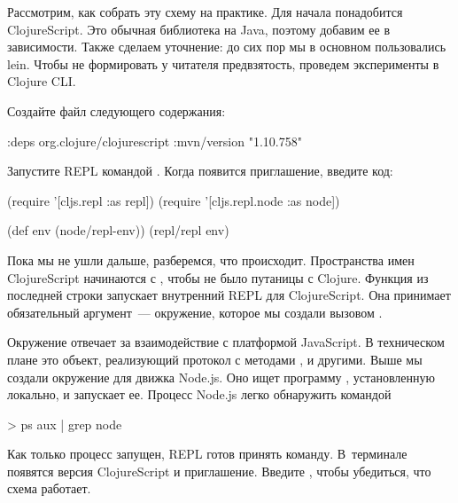 \begin{figure}[H]
  \centering
  
  \label{fig:chart-repl-04}
\end{figure}

Рассмотрим, как собрать эту схему на практике. Для начала понадобится ClojureScript. Это обычная библиотека на Java, поэтому добавим ее в зависимости. Также сделаем уточнение: до сих пор мы в основном пользовались lein. Чтобы не формировать у читателя предвзятость, проведем эксперименты в Clojure CLI.

Создайте файл  следующего содержания:

\begin{english}
  \begin{clojure}
{:deps
 {org.clojure/clojurescript {:mvn/version "1.10.758"}}}
  \end{clojure}
\end{english}

Запустите REPL командой . Когда появится приглашение, введите код:

\begin{english}
  \begin{clojure}
(require '[cljs.repl :as repl])
(require '[cljs.repl.node :as node])

(def env (node/repl-env))
(repl/repl env)
  \end{clojure}
\end{english}

Пока мы не ушли дальше, разберемся, что происходит. Пространства имен ClojureScript начинаются с , чтобы не было путаницы с Clojure. Функция  из последней строки запускает внутренний REPL для ClojureScript. Она принимает обязательный аргумент~--- окружение, которое мы создали вызовом .

Окружение отвечает за взаимодействие с платформой JavaScript. В техническом плане это объект, реализующий протокол  с методами ,  и другими. Выше мы создали окружение для движка Node.js. Оно ищет программу , установленную локально, и запускает ее. Процесс Node.js легко обнаружить командой

\begin{english}
  \begin{bash}
> ps aux | grep node
  \end{bash}
\end{english}

Как только процесс запущен, REPL готов принять команду. В~терминале появятся версия ClojureScript и приглашение. Введите , чтобы убедиться, что схема работает.

